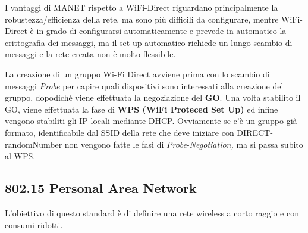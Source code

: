 I vantaggi di MANET rispetto a WiFi-Direct riguardano principalmente la
robustezza/efficienza della rete, ma sono più difficili da configurare,
mentre WiFi-Direct è in grado di configurarsi automaticamente e prevede
in automatico la crittografia dei messaggi, ma il set-up automatico
richiede un lungo scambio di messaggi e la rete creata non è molto
flessibile.

La creazione di un gruppo Wi-Fi Direct avviene prima con lo scambio di
messaggi \emph{Probe} per capire quali dispositivi sono interessati alla
creazione del gruppo, dopodiché viene effettuata la negoziazione del
\textbf{GO}. Una volta stabilito il GO, viene effettuata la fase di
\textbf{WPS (WiFi Proteced Set Up)} ed infine vengono stabiliti gli IP
locali mediante DHCP. Ovviamente se c'è un gruppo già formato,
identificabile dal SSID della rete che deve iniziare con
DIRECT-randomNumber non vengono fatte le fasi di
\emph{Probe}-\emph{Negotiation,} ma si passa subito al WPS.

\subsection{802.15 Personal Area Network}\label{personal-area-network}

L'obiettivo di questo standard è di definire una rete wireless a corto
raggio e con consumi ridotti.
